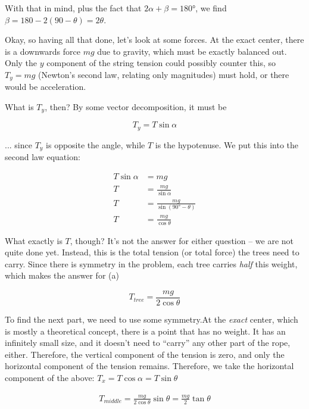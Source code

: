 \documentclass[12pt,a4paper]{report}
\begin{document}
With that in mind, plus the fact that $2 \alpha + \beta = \ang{180}$, we find $\beta = 180 - 2(90 - \theta) = 2 \theta$.

Okay, so having all that done, let's  look at some forces. At the exact center, there is a downwards force $m g$ due to gravity, which must be exactly balanced out. Only the $y$ component of the string tension could possibly counter this, so $T_y = m g$ (Newton's second law, relating only magnitudes) must hold, or there would be acceleration.

What is $T_y$, then? By some vector decomposition, it must be

\begin{equation}
T_y = T \sin \alpha
\end{equation}

... since $T_y$ is opposite the angle, while $T$ is the hypotenuse. We put this into the second law equation:

\begin{align}
T \sin \alpha &= m g\\
T &= \frac{m g}{\sin \alpha}\\
T &= \frac{m g}{\sin (\ang{90} - \theta)}\\
T &= \frac{m g}{\cos\theta}
\end{align}

What exactly is $T$, though? It's not the answer for either question -- we are not quite done yet. Instead, this is the total tension (or total force) the trees need to carry. Since there is symmetry in the problem, each tree carries \emph{half} this weight, which makes the answer for (a)

\begin{equation}
T_{tree} = \frac{m g}{2 \cos \theta}
\end{equation}

To find the next part, we need to use some symmetry.At the \emph{exact} center, which is mostly a theoretical concept, there is a point that has no weight. It has an infinitely small size, and it doesn't need to ``carry'' any other part of the rope, either. Therefore, the vertical component of the tension is zero, and only the horizontal component of the tension remains. Therefore, we take the horizontal component of the above: $T_x = T \cos \alpha = T \sin \theta$

\begin{align}
T_{middle} = \frac{m g}{2 \cos \theta} \sin \theta = \frac{m g}{2} \tan \theta
\end{align}
\end{document}

